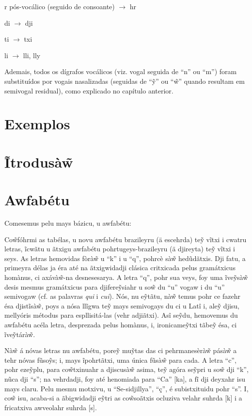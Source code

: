 \documentclass[12pt, a5paper, titlepage]{article}
\begin{document}
\begin{bilingualpages}
    r pós-vocálico (seguido de consoante) $\rightarrow$ hr

    di $\rightarrow$ dji
    
    ti $\rightarrow$ txi

    li $\rightarrow$ lli, lly

    Ademais, todos os dígrafos vocálicos (viz. vogal seguida de ``n'' ou ``m'') foram substituídos por vogais nasalizadas (seguidas de ``\~y'' ou ``\~w'' quando resultam em semivogal residual), como explicado no capítulo anterior.
    
    \section{Exemplos}
    
    \leftpage
    \section{Ĩtrodusà\~w}
    
    \newpage
    \section{Awfabétu}
    Comesemus pelu mays bázicu, u awfabétu:
    \BrTableAbc
    
    Co\~wfóhrmi as tabélas, u novu awfabétu brazileyru (ä escehrda) te\~y vĩtxi i cwatru letras, ĩcwãtu u ãtxigu awfabétu pohrtugeys-brazileyru (ä djireyta) te\~y vĩtxi i seys. As letras hemovidas fòrà\~w u ``k'' i u ``q'', pohrcè sà\~w hedũdãtxis. Dji fatu, a primeyra délas ja éra até na ãtxigwidadji clásica critxicada pelus gramátxicus homànus, ci axávà\~w-na desnesesarya. A letra ``q'', pohr sua veys, foy uma ĩve\~ysà\~w desis mesmus gramátxicus para djifere\~ysiahr u so\~w du ``u'' vogaw i du ``u'' semivogaw (cf. as palavras \textit{qui} i \textit{cui}). Nós, nu e\~ytãtu, nà\~w temus pohr ce fazehr ésa djistĩsà\~w, poys a nósa llĩgwa te\~y mays semivogays du ci u Latî i, ale\~y djisu, mellyóris métodus para espllisitá-las (vehr adjiãtxi). Asî se\~ydu, hemovemus du awfabétu acéla letra, desprezada pelus homànus, i, ironicame\~ytxi tãbe\~y ésa, ci ĩve\~ytárà\~w.

    Nà\~w á nóvas letras nu awfabétu, pore\~y mu\~ytas das ci pehrmanesèrà\~w pásà\~w a tehr nóvas fũso\~ys; i, mays ĩpohrtãtxi, uma única fũsà\~w para cada. A letra ``c'', pohr eze\~yplu, para co\~wtxinuahr a djiscusà\~w asima, te\~y agóra se\~ypri u so\~w dji ``k'', nũca dji ``s''; na vehrdadji, foy até henomiada para ``Ca'' [ka], a fĩ dji deyxahr isu mays claru. Pelu mesmu motxivu, u ``Se-sidjillya'', ``ç'', é subistxituidu pohr ``s''. I, co\~w isu, acaba-si a ãbigwidadji e\~ytri as co\~wsoãtxis ocluziva velahr suhrda [k] i a fricatxiva awveolahr suhrda [s].


\end{bilingualpages}
\end{document}
